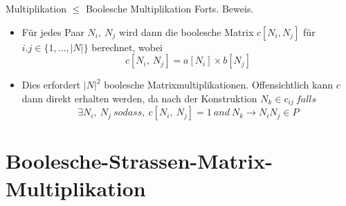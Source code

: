 \documentclass{beamer}
\begin{document}
	\begin{frame}{Multiplikation $\le$ Boolesche Multiplikation}
		Forts. Beweis. 
		\begin{itemize}
			\pause
			\item Für jedes Paar $N_i,\ N_j$ wird dann die boolesche Matrix $c[N_i, N_j]$ für $i.j \in \{1,\ldots,|N|\}$ berechnet, wobei
			$$c[N_i,\ N_j] = a[N_i] \times b[N_j]$$
			\pause
			\item Dies erfordert ${|N|}^2$ boolesche Matrixmultiplikationen. Offensichtlich kann $c$ dann direkt erhalten werden, da nach der Konstruktion $N_k \in c_{ij} \ falls$
			$$\exists N_i,\ N_j \ so dass, \ c[N_i,\ N_j] = 1 \ and\ N_k \to N_i N_j  \in P$$
		\end{itemize}
	\end{frame}
	

	
	
	
	
	\section{Boolesche-Strassen-Matrix-Multiplikation}
\end{document}
